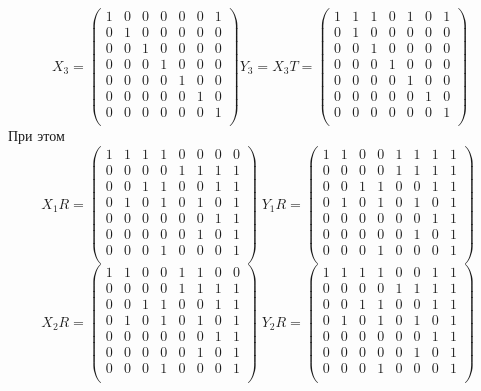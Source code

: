 $$
X_3=\begin{pmatrix}
1&0&0&0&0&0&1\\
0&1&0&0&0&0&0\\
0&0&1&0&0&0&0\\
0&0&0&1&0&0&0\\
0&0&0&0&1&0&0\\
0&0&0&0&0&1&0\\
0&0&0&0&0&0&1\\
\end{pmatrix}
Y_3=X_3T=\begin{pmatrix}
1&1&1&0&1&0&1\\
0&1&0&0&0&0&0\\
0&0&1&0&0&0&0\\
0&0&0&1&0&0&0\\
0&0&0&0&1&0&0\\
0&0&0&0&0&1&0\\
0&0&0&0&0&0&1\\
\end{pmatrix}
$$
При этом
$$
X_1R=
\begin{pmatrix}
1&1&1&1&0&0&0&0\\
0&0&0&0&1&1&1&1\\
0&0&1&1&0&0&1&1\\
0&1&0&1&0&1&0&1\\
0&0&0&0&0&0&1&1\\
0&0&0&0&0&1&0&1\\
0&0&0&1&0&0&0&1\\
\end{pmatrix}\;
Y_1R=
\begin{pmatrix}
1&1&0&0&1&1&1&1\\
0&0&0&0&1&1&1&1\\
0&0&1&1&0&0&1&1\\
0&1&0&1&0&1&0&1\\
0&0&0&0&0&0&1&1\\
0&0&0&0&0&1&0&1\\
0&0&0&1&0&0&0&1\\
\end{pmatrix}\;
$$
$$
X_2R=
\begin{pmatrix}
1&1&0&0&1&1&0&0\\
0&0&0&0&1&1&1&1\\
0&0&1&1&0&0&1&1\\
0&1&0&1&0&1&0&1\\
0&0&0&0&0&0&1&1\\
0&0&0&0&0&1&0&1\\
0&0&0&1&0&0&0&1\\
\end{pmatrix}\;
Y_2R=
\begin{pmatrix}
1&1&1&1&0&0&1&1\\
0&0&0&0&1&1&1&1\\
0&0&1&1&0&0&1&1\\
0&1&0&1&0&1&0&1\\
0&0&0&0&0&0&1&1\\
0&0&0&0&0&1&0&1\\
0&0&0&1&0&0&0&1\\
\end{pmatrix}\;
$$
